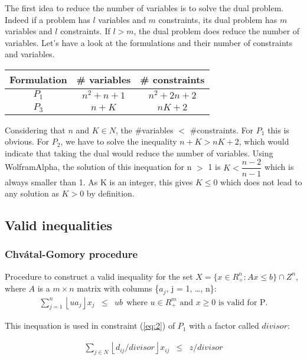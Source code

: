 \documentclass[a4paper,10pt]{article}
\begin{document}
The first idea to reduce the number of variables is to solve the dual problem. Indeed if a problem has $l$ variables and $m$ constraints, its dual problem has $m$ variables and $l$ constraints. If $l > m$, the dual problem does reduce the number of variables. Let's have a look at the formulations and their number of constraints and variables.

\begin{table}[h!]
\centering
\begin{tabular}{c|c|c}
    Formulation & \# variables & \# constraints \\
    \hline
    $P_1$ & $n^2 + n + 1$ & $n^2 + 2n + 2$ \\
    $P_3$ & $n + K$ & $nK+2$
\end{tabular}
\end{table}

Considering that $n$ and $K \in N$, the \#variables $<$ \#constraints. For $P_1$ this is obvious. For $P_2$, we have to solve the inequality $n + K > nK + 2$, which would indicate that taking the dual would reduce the number of variables. Using WolframAlpha, the solution of this inequation for n $>$ 1 is $K < \dfrac{n-2}{n-1}$ which is always smaller than 1. As K is an integer, this gives $K \leq 0$ which does not lead to any solution as $K > 0$ by definition. 

\subsection{Valid inequalities}

\subsubsection{Chv\'atal-Gomory procedure}

Procedure to construct a valid inequality for the set $ X = \{x \in R^n_{+}: Ax \leq b \} \cap Z^n$, where $A$ is a $m \times n$ matrix with columns \{$a_j$, j = 1, \ldots, n\}:	
\begin{eqnarray*}
    \sum_{j=1}^n \left \lfloor{ua_j}\right \rfloor x_j & \leq & ub ~~ \text{where $u \in R^m_{+}$ and $x \geq 0$ is valid for P.}
\end{eqnarray*}

This inequation is used in constraint (\ref{eq:2}) of $P_1$ with a factor called $divisor$:
 
	\begin{eqnarray}
	 \sum_{j \in N} \left \lfloor{d_{ij}/divisor}\right \rfloor x_{ij} &\leq& z/divisor \label{eq:2_VI}
	\end{eqnarray}
	
\end{document}
